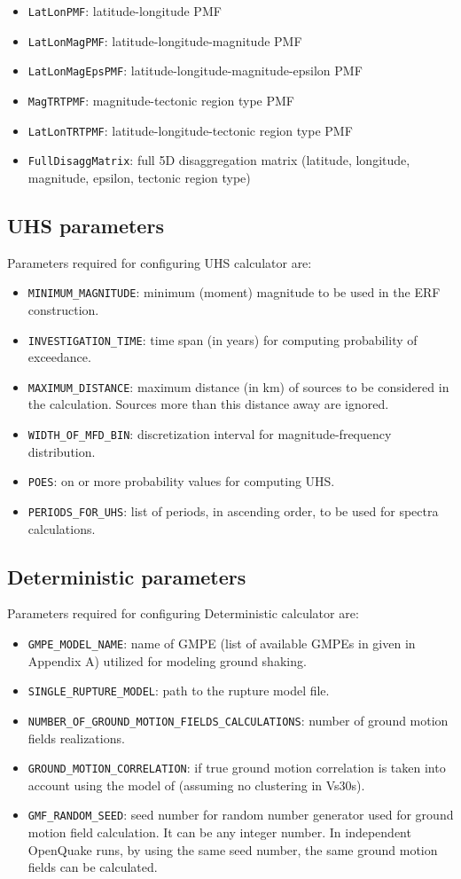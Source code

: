 \begin{itemize}
\begin{itemize}
\item \Verb+LatLonPMF+: latitude-longitude PMF
\item \Verb+LatLonMagPMF+: latitude-longitude-magnitude PMF
\item \Verb+LatLonMagEpsPMF+: latitude-longitude-magnitude-epsilon PMF
\item \Verb+MagTRTPMF+: magnitude-tectonic region type PMF
\item \Verb+LatLonTRTPMF+: latitude-longitude-tectonic region type PMF
\item \Verb+FullDisaggMatrix+: full 5D disaggregation matrix (latitude, longitude, magnitude, epsilon, tectonic region type)
\end{itemize}
\end{itemize}

\subsection{UHS parameters}
Parameters required for configuring UHS calculator are:
\begin{itemize}
\item \Verb+MINIMUM_MAGNITUDE+: minimum (moment) magnitude to be used in the ERF construction.
\item \Verb+INVESTIGATION_TIME+: time span (in years) for computing probability of exceedance.
\item \Verb+MAXIMUM_DISTANCE+: maximum distance (in km) of sources to be considered in the calculation. Sources more than this distance away are ignored.
\item \Verb+WIDTH_OF_MFD_BIN+: discretization interval for  magnitude-frequency distribution.
\item \Verb+POES+: on or more probability values for computing UHS.
\item \Verb+PERIODS_FOR_UHS+:  list of periods, in ascending order, to be used for spectra calculations.
\end{itemize}

\subsection{Deterministic parameters}
Parameters required for configuring Deterministic calculator are:
\begin{itemize}
\item \Verb+GMPE_MODEL_NAME+: name of GMPE (list of available GMPEs in given in Appendix A) utilized for modeling ground shaking.
\item \Verb+SINGLE_RUPTURE_MODEL+: path to the rupture model file.
\item \Verb+NUMBER_OF_GROUND_MOTION_FIELDS_CALCULATIONS+: number of ground motion fields realizations.
\item \Verb+GROUND_MOTION_CORRELATION+:  if true ground motion correlation is taken into account using the model of \cite{Jayaram2009} (assuming no clustering in Vs30s).
\item \Verb+GMF_RANDOM_SEED+: seed number for random number generator used for ground motion field calculation. It can be any integer number. In independent OpenQuake runs, by using the same seed number, the same ground motion fields can be calculated.
\end{itemize}
